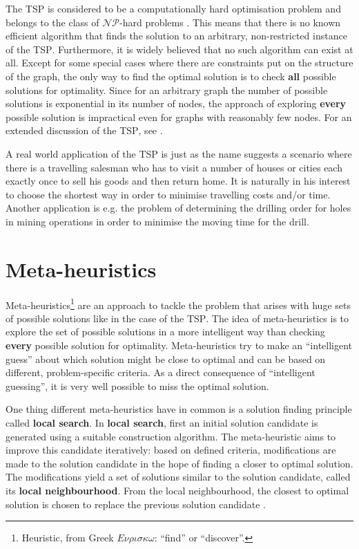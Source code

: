 
The \textsc{TSP} is considered to be a computationally hard optimisation problem and belongs to the class of $\mathcal{NP}$-hard problems \cite{Garey:1979:CIG:578533}. This means that there is no known efficient algorithm that finds the solution to an arbitrary, non-restricted instance of the \textsc{TSP}. Furthermore, it is widely believed that no such algorithm can exist at all. Except for some special cases where there are constraints put on the structure of the graph, the only way to find the optimal solution is to check \textbf{all} possible solutions for optimality. Since for an arbitrary graph the number of possible solutions is exponential in its number of nodes, the approach of exploring \textbf{every} possible solution is impractical even for graphs with reasonably few nodes. For an extended discussion of the \textsc{TSP}, see \cite{shmoys1985traveling}.

A real world application of the \textsc{TSP} is just as the name suggests a scenario where there is a travelling salesman who has to visit a number of houses or cities each exactly once to sell his goods and then return home. It is naturally in his interest to choose the shortest way in order to minimise travelling costs and/or time. Another application is e.g. the problem of determining the drilling order for holes in mining operations in order to minimise the moving time for the drill.

\section{Meta-heuristics}
\label{chp:meta_heuristics}
Meta-heuristics\footnote{Heuristic, from Greek $E\nu\rho\iota\sigma\kappa\omega$: \enquote{find} or \enquote{discover}.} are an approach to tackle the problem that arises with huge sets of possible solutions like in the case of the \textsc{TSP}. The idea of meta-heuristics is to explore the set of possible solutions in a more intelligent way than checking \textbf{every} possible solution for optimality. Meta-heuristics try to make an \enquote{intelligent guess} about which solution might be close to optimal and can be based on different, problem-specific criteria. As a direct consequence of \enquote{intelligent guessing}, it is very well possible to miss the optimal solution.

One thing different meta-heuristics have in common is a solution finding principle called \textbf{local search}. In \textbf{local search}, first an initial solution candidate is generated using a suitable construction algorithm. The meta-heuristic aims to improve this candidate iteratively: based on defined criteria, modifications are made to the solution candidate in the hope of finding a closer to optimal solution. The modifications yield a set of solutions similar to the solution candidate, called its \textbf{local neighbourhood}. From the local neighbourhood, the closest to optimal solution is chosen to replace the previous solution candidate \cite{Dorigo:2004:ACO:975277}.


